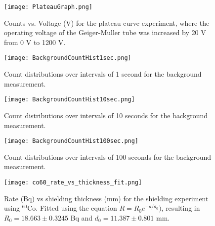 \begin{figure}[H]
	\centering
	\texttt{[image: PlateauGraph.png]}
	\caption{Counts vs. Voltage (V) for the plateau curve experiment, where the operating voltage of the Geiger-Muller tube was increased by 20 V from 0 V to 1200 V.}
\end{figure}

\begin{figure}[H]
	\centering
	\texttt{[image: BackgroundCountHist1sec.png]}
	\caption{Count distributions over intervals of 1 second for the background measurement.}
\end{figure}

\begin{figure}[H]
	\centering
	\texttt{[image: BackgroundCountHist10sec.png]}
	\caption{Count distributions over intervals of 10 seconds for the background measurement.}
\end{figure}

\begin{figure}[H]
	\centering
	\texttt{[image: BackgroundCountHist100sec.png]}
	\caption{Count distributions over intervals of 100 seconds for the background measurement.}
\end{figure}

\begin{table}[H]
    \centering
     \label{tab:at} 
    
\end{table}

\begin{figure}[H]
	\centering
	\texttt{[image: co60\_rate\_vs\_thickness\_fit.png]}
	\caption{Rate (Bq) vs shielding thickness (mm) for the shielding experiment using $^{60}$Co. Fitted using the equation $R = R_0 e^{-d/d_0})$, resulting in $R_0 = 18.663 \pm 0.3245$ Bq and $d_0 = 11.387 \pm 0.801$ mm.}
\end{figure}



